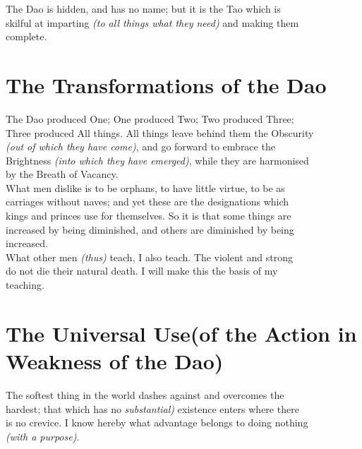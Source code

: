     The Dao is hidden, and has no name; but it is the Tao which is\\
    skilful at imparting \textit{(to all things what they need)} and making them\\
    complete.\vspace{\baselineskip}
\section*{The Transformations of the Dao}
    The Dao produced One; One produced Two; Two produced Three;\\
    Three produced All things. All things leave behind them the Obscurity\\
    \textit{(out of which they have come)}, and go forward to embrace the\\
    Brightness \textit{(into which they have emerged)}, while they are harmonised\\
    by the Breath of Vacancy.\\
    
    What men dislike is to be orphans, to have little virtue, to be as\\
    carriages without naves; and yet these are the designations which\\
    kings and princes use for themselves. So it is that some things are\\
    increased by being diminished, and others are diminished by being\\
    increased.\\
    
    What other men \textit{(thus)} teach, I also teach. The violent and strong\\
    do not die their natural death. I will make this the basis of my\\
    teaching.\\
    
\section*{The Universal Use(of the Action in Weakness of the Dao)}
    The softest thing in the world dashes against and overcomes the\\
    hardest; that which has no \textit{substantial)} existence enters where there\\
    is no crevice. I know hereby what advantage belongs to doing nothing\\
    \textit{(with a purpose)}.\vspace{\baselineskip}
    
